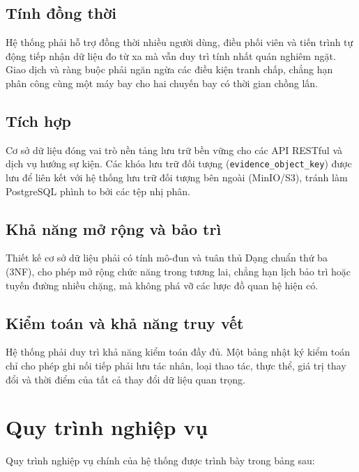 \subsection{Tính đồng thời}
Hệ thống phải hỗ trợ đồng thời nhiều người dùng, điều phối viên và tiến trình tự động tiếp nhận dữ liệu đo từ xa mà vẫn duy trì tính nhất quán nghiêm ngặt. Giao dịch và ràng buộc phải ngăn ngừa các điều kiện tranh chấp, chẳng hạn phân công cùng một máy bay cho hai chuyến bay có thời gian chồng lấn.

\subsection{Tích hợp}
Cơ sở dữ liệu đóng vai trò nền tảng lưu trữ bền vững cho các API RESTful và dịch vụ hướng sự kiện. Các khóa lưu trữ đối tượng (\texttt{evidence\_object\_key}) được lưu để liên kết với hệ thống lưu trữ đối tượng bên ngoài (MinIO/S3), tránh làm PostgreSQL phình to bởi các tệp nhị phân.

\subsection{Khả năng mở rộng và bảo trì}
Thiết kế cơ sở dữ liệu phải có tính mô-đun và tuân thủ Dạng chuẩn thứ ba (3NF), cho phép mở rộng chức năng trong tương lai, chẳng hạn lịch bảo trì hoặc tuyến đường nhiều chặng, mà không phá vỡ các lược đồ quan hệ hiện có.

\subsection{Kiểm toán và khả năng truy vết}
Hệ thống phải duy trì khả năng kiểm toán đầy đủ. Một bảng nhật ký kiểm toán chỉ cho phép ghi nối tiếp phải lưu tác nhân, loại thao tác, thực thể, giá trị thay đổi và thời điểm của tất cả thay đổi dữ liệu quan trọng.

\section{Quy trình nghiệp vụ}\label{s:process}

Quy trình nghiệp vụ chính của hệ thống được trình bày trong bảng sau:


